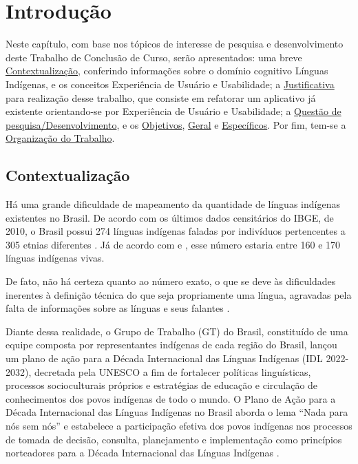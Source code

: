 \chapter[Introdução]{Introdução}

Neste capítulo, com base nos tópicos de interesse de pesquisa e desenvolvimento deste Trabalho de Conclusão de Curso, serão apresentados: uma breve
\hyperref[sec:Contextualização]{Contextualização}, conferindo informações sobre o domínio cognitivo Línguas Indígenas, e os conceitos Experiência de Usuário e
Usabilidade; a \hyperref[sec:Justificativa]{Justificativa} para realização desse trabalho, que consiste em refatorar um aplicativo já existente orientando-se por
Experiência de Usuário e Usabilidade; a \hyperref[sec:QuestaodePesquisa]{Questão de pesquisa/Desenvolvimento}, e os \hyperref[sec:Objetivos]{Objetivos}, \hyperref[sec:ObjetivoGeral]{Geral} e
\hyperref[sec:ObjetivosEspecificos]{Específicos}. Por fim, tem-se a \hyperref[sec:OrganizacaodoTrabalho]{Organização do Trabalho}.

\section{Contextualização}
\label{sec:Contextualização}

Há uma grande dificuldade de mapeamento da quantidade de línguas indígenas existentes no Brasil. De acordo com os últimos dados censitários do IBGE, de 2010, o Brasil
possui 274 línguas indígenas faladas por indivíduos pertencentes a 305 etnias diferentes \cite{ibge}. Já de acordo com \cite{galucioetal2018} e \cite{dangelis2014}, esse
número estaria entre 160 e 170 línguas indígenas vivas.

De fato, não há certeza quanto ao número exato, o que se deve às dificuldades inerentes à definição técnica do que seja propriamente uma língua, agravadas pela falta de
informações sobre as línguas e seus falantes \cite{seki2000}.

Diante dessa realidade, o Grupo de Trabalho (GT) do Brasil, constituído de uma equipe composta por representantes indígenas de cada região do Brasil, lançou um plano de
ação para a Década Internacional das Línguas Indígenas (IDL 2022-2032), decretada pela UNESCO a fim de fortalecer políticas linguísticas, processos socioculturais
próprios e estratégias de educação e circulação de conhecimentos dos povos indígenas de todo o mundo. O Plano de Ação para a Década Internacional das Línguas Indígenas no
Brasil aborda o lema “Nada para nós sem nós” e estabelece a participação efetiva dos povos indígenas nos processos de tomada de decisão, consulta, planejamento e
implementação como princípios norteadores para a Década Internacional das Línguas Indígenas \cite{gtbrasil2021}.

